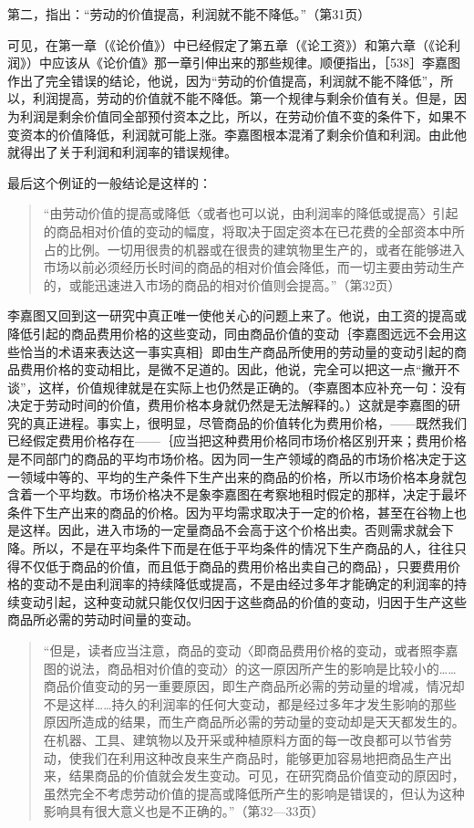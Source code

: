 第二，指出：“劳动的价值提高，利润就不能不降低。”（第31页）

可见，在第一章（《论价值》）中已经假定了第五章（《论工资》）和第六章（《论利润》）中应该从《论价值》那一章引伸出来的那些规律。顺便指出，［538］李嘉图作出了完全错误的结论，他说，因为“劳动的价值提高，利润就不能不降低”，所以，利润提高，劳动的价值就不能不降低。第一个规律与剩余价值有关。但是，因为利润是剩余价值同全部预付资本之比，所以，在劳动价值不变的条件下，如果不变资本的价值降低，利润就可能上涨。李嘉图根本混淆了剩余价值和利润。由此他就得出了关于利润和利润率的错误规律。

最后这个例证的一般结论是这样的：

\begin{quote}{“由劳动价值的提高或降低〈或者也可以说，由利润率的降低或提高〉引起的商品相对价值的变动的幅度，将取决于固定资本在已花费的全部资本中所占的比例。一切用很贵的机器或在很贵的建筑物里生产的，或者在能够进入市场以前必须经历长时间的商品的相对价值会降低，而一切主要由劳动生产的，或能迅速进入市场的商品的相对价值则会提高。”（第32页）}\end{quote}

李嘉图又回到这一研究中真正唯一使他关心的问题上来了。他说，由工资的提高或降低引起的商品费用价格的这些变动，同由商品价值的变动｛李嘉图远远不会用这些恰当的术语来表达这一事实真相｝即由生产商品所使用的劳动量的变动引起的商品费用价格的变动相比，是微不足道的。因此，他说，完全可以把这一点“撇开不谈”，这样，价值规律就是在实际上也仍然是正确的。（李嘉图本应补充一句：没有决定于劳动时间的价值，费用价格本身就仍然是无法解释的。）这就是李嘉图的研究的真正进程。事实上，很明显，尽管商品的价值转化为费用价格，——既然我们已经假定费用价格存在——｛应当把这种费用价格同市场价格区别开来；费用价格是不同部门的商品的平均市场价格。因为同一生产领域的商品的市场价格决定于这一领域中等的、平均的生产条件下生产出来的商品的价格，所以市场价格本身就包含着一个平均数。市场价格决不是象李嘉图在考察地租时假定的那样，决定于最坏条件下生产出来的商品的价格。因为平均需求取决于一定的价格，甚至在谷物上也是这样。因此，进入市场的一定量商品不会高于这个价格出卖。否则需求就会下降。所以，不是在平均条件下而是在低于平均条件的情况下生产商品的人，往往只得不仅低于商品的价值，而且低于商品的费用价格出卖自己的商品｝，只要费用价格的变动不是由利润率的持续降低或提高，不是由经过多年才能确定的利润率的持续变动引起，这种变动就只能仅仅归因于这些商品的价值的变动，归因于生产这些商品所必需的劳动时间量的变动。

\begin{quote}{“但是，读者应当注意，商品的变动〈即商品费用价格的变动，或者照李嘉图的说法，商品相对价值的变动〉的这一原因所产生的影响是比较小的……商品价值变动的另一重要原因，即生产商品所必需的劳动量的增减，情况却不是这样……持久的利润率的任何大变动，都是经过多年才发生影响的那些原因所造成的结果，而生产商品所必需的劳动量的变动却是天天都发生的。在机器、工具、建筑物以及开采或种植原料方面的每一改良都可以节省劳动，使我们在利用这种改良来生产商品时，能够更加容易地把商品生产出来，结果商品的价值就会发生变动。可见，在研究商品价值变动的原因时，虽然完全不考虑劳动价值的提高或降低所产生的影响是错误的，但认为这种影响具有很大意义也是不正确的。”（第32—33页）}\end{quote}

